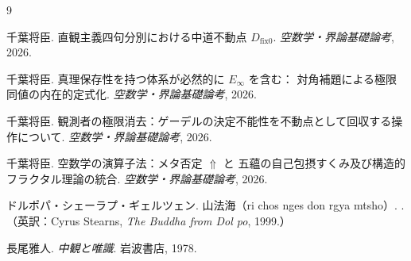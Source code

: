 \documentclass[11pt,a4paper]{article}
\theoremstyle{definition}
\newcommand{\dfix}{D_{\mathrm{fix}0}}
\newcommand{\metanegation}{\Uparrow}
\begin{document}
\begin{thebibliography}{9}

千葉将臣.
\newblock 直観主義四句分別における中道不動点 $\dfix$.
\newblock \emph{空数学・界論基礎論考}, 2026.

千葉将臣.
\newblock 真理保存性を持つ体系が必然的に $E_\infty$ を含む：
対角補題による極限同値の内在的定式化.
\newblock \emph{空数学・界論基礎論考}, 2026.

千葉将臣.
\newblock 観測者の極限消去：ゲーデルの決定不能性を不動点として回収する操作について.
\newblock \emph{空数学・界論基礎論考}, 2026.

千葉将臣.
\newblock 空数学の演算子法：メタ否定 $\metanegation$ と
五蘊の自己包摂すくみ及び構造的フラクタル理論の統合.
\newblock \emph{空数学・界論基礎論考}, 2026.

ドルポパ・シェーラプ・ギェルツェン.
\newblock 山法海（ri chos nges don rgya mtsho）.
.
\newblock （英訳：Cyrus Stearns, \emph{The Buddha from Dol po}, 1999.）

長尾雅人.
\newblock \emph{中観と唯識}.
\newblock 岩波書店, 1978.

\end{thebibliography}
\end{document}
